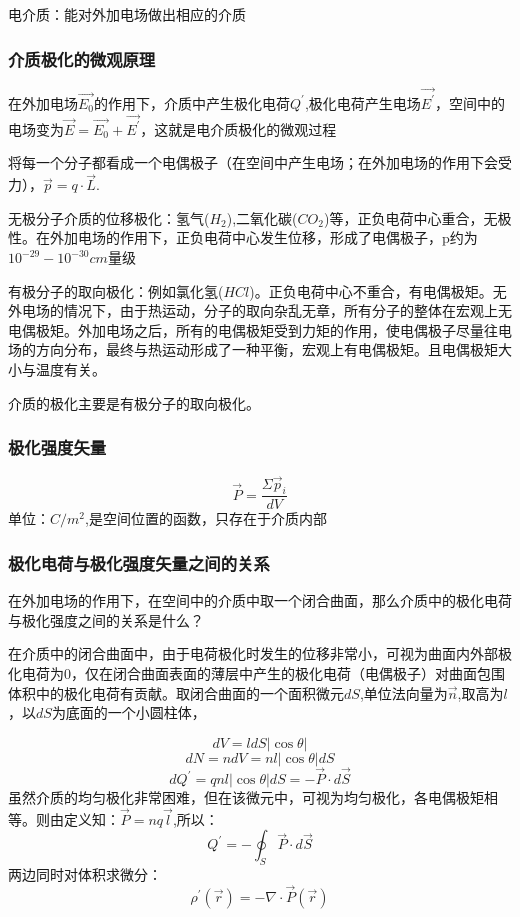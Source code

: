 \documentclass[11pt]{ctexart}
\begin{document}
电介质：能对外加电场做出相应的介质


\subsubsection{介质极化的微观原理}
在外加电场$\vec{E_0}$的作用下，介质中产生极化电荷$Q^\prime$,极化电荷产生电场$\vec{E^\prime}$，空间中的电场变为$\vec{E}=\vec{E_0}+\vec{E^\prime}$，这就是电介质极化的微观过程


将每一个分子都看成一个电偶极子（在空间中产生电场；在外加电场的作用下会受力），$\vec{p}=q\cdot\vec{L}$.

无极分子介质的位移极化：氢气($H_2$),二氧化碳($CO_2$)等，正负电荷中心重合，无极性。在外加电场的作用下，正负电荷中心发生位移，形成了电偶极子，p约为$10^{-29}-10^{-30}cm$量级

有极分子的取向极化：例如氯化氢($HCl$)。正负电荷中心不重合，有电偶极矩。无外电场的情况下，由于热运动，分子的取向杂乱无章，所有分子的整体在宏观上无电偶极矩。外加电场之后，所有的电偶极矩受到力矩的作用，使电偶极子尽量往电场的方向分布，最终与热运动形成了一种平衡，宏观上有电偶极矩。且电偶极矩大小与温度有关。

介质的极化主要是有极分子的取向极化。

\subsubsection{极化强度矢量}
\begin{equation}
    \vec{P}=\frac{\Sigma \vec{p}_i}{dV}
\end{equation}
单位：$C/m^2$,是空间位置的函数，只存在于介质内部

\subsubsection{极化电荷与极化强度矢量之间的关系}
在外加电场的作用下，在空间中的介质中取一个闭合曲面，那么介质中的极化电荷与极化强度之间的关系是什么？

在介质中的闭合曲面中，由于电荷极化时发生的位移非常小，可视为曲面内外部极化电荷为0，仅在闭合曲面表面的薄层中产生的极化电荷（电偶极子）对曲面包围体积中的极化电荷有贡献。取闭合曲面的一个面积微元$dS$,单位法向量为$\vec{n}$,取高为$l$，以$dS$为底面的一个小圆柱体，

\begin{equation}
    dV=l dS |\cos \theta|
\end{equation}
\begin{equation}
    dN=n dV=n l|\cos\theta| dS
\end{equation}
\begin{equation}
    dQ^\prime=q n l |\cos \theta| dS
    =-\vec{P}\cdot d\vec{S}
\end{equation}
虽然介质的均匀极化非常困难，但在该微元中，可视为均匀极化，各电偶极矩相等。则由定义知：$\vec{P}=n q \vec{l}$,所以：
\begin{equation}
    Q^ \prime=-\oint_S \vec{P} \cdot d\vec{S}
\end{equation}
两边同时对体积求微分：
\begin{equation}
\rho^\prime (\vec{r})=-\nabla \cdot \vec{P}(\vec{r})
\end{equation}
\end{document}
